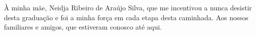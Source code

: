À minha mãe, Neidja Ribeiro de Araújo Silva, que me incentivou a nunca desistir desta
graduação e foi a minha força em cada etapa desta caminhada. Aos nossos familiares e amigos,
que estiveram conosco até aqui.
